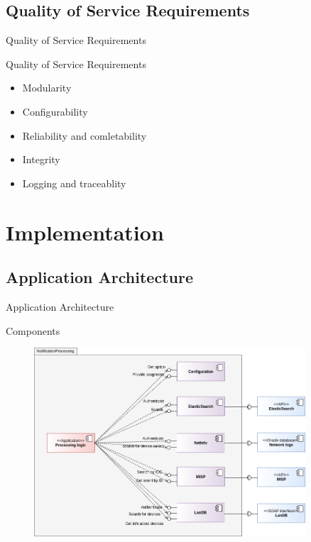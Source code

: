 \documentclass{beamer}
\begin{document}
\subsection{Quality of Service Requirements}
\begin{frame}{Quality of Service Requirements}
\begin{block}{Quality of Service Requirements}
\begin{itemize}
    \item Modularity
    \item Configurability
    \item Reliability and comletability
    \item Integrity
    \item Logging and traceablity
\end{itemize}
\end{block}
\end{frame}


\section{Implementation}
\subsection{Application Architecture}
\begin{frame}{Application Architecture}
\begin{block}{Components}
\begin{figure}
    \centering
    \includegraphics[width=0.9\textwidth]{component-diag.png}
\end{figure}
\end{block}
\end{frame}
\end{document}
